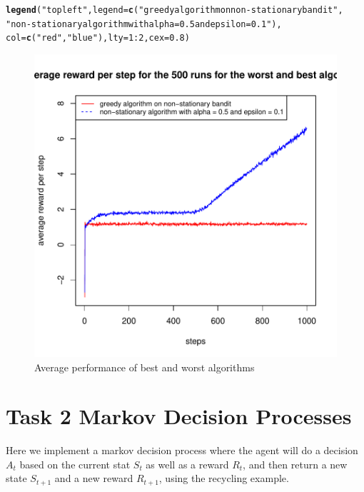 \documentclass[10pt, a4paper, english]{article}\usepackage[]{graphicx}\usepackage[dvipsnames]{xcolor}
\makeatletter
\def\maxwidth{ %
  \ifdim\Gin@nat@width>\linewidth
    \linewidth
  \else
    \Gin@nat@width
  \fi
}
\newcommand{\hlnum}[1]{\textcolor[rgb]{0.686,0.059,0.569}{#1}}%
\newcommand{\hlstr}[1]{\textcolor[rgb]{0.192,0.494,0.8}{#1}}%
\newcommand{\hlopt}[1]{\textcolor[rgb]{0,0,0}{#1}}%
\newcommand{\hlstd}[1]{\textcolor[rgb]{0.345,0.345,0.345}{#1}}%
\newcommand{\hlkwc}[1]{\textcolor[rgb]{0.333,0.667,0.333}{#1}}%
\newcommand{\hlkwd}[1]{\textcolor[rgb]{0.737,0.353,0.396}{\textbf{#1}}}%
\newenvironment{kframe}{%
 \def\at@end@of@kframe{}%
 \ifinner\ifhmode%
  \def\at@end@of@kframe{\end{minipage}}%
  \begin{minipage}{\columnwidth}%
 \fi\fi%
 \def\FrameCommand##1{\hskip\@totalleftmargin \hskip-\fboxsep
 \colorbox{shadecolor}{##1}\hskip-\fboxsep
     \hskip-\linewidth \hskip-\@totalleftmargin \hskip\columnwidth}%
 \MakeFramed {\advance\hsize-\width
   \@totalleftmargin\z@ \linewidth\hsize
   \@setminipage}}%
 {\par\unskip\endMakeFramed%
 \at@end@of@kframe}
\newenvironment{knitrout}{}{} %
\makeatother
\begin{document}
\begin{knitrout}
\begin{kframe}
\begin{alltt}
\hlkwd{legend}\hlstd{(}\hlstr{"topleft"}\hlstd{,} \hlkwc{legend} \hlstd{=} \hlkwd{c}\hlstd{(}\hlstr{"greedy algorithm on non-stationary bandit"}\hlstd{,}
                 \hlstr{"non-stationary algorithm with alpha = 0.5 and epsilon = 0.1"}\hlstd{),}
       \hlkwc{col} \hlstd{=} \hlkwd{c}\hlstd{(}\hlstr{"red"}\hlstd{,} \hlstr{"blue"}\hlstd{),} \hlkwc{lty} \hlstd{=} \hlnum{1}\hlopt{:}\hlnum{2}\hlstd{,} \hlkwc{cex} \hlstd{=} \hlnum{0.8}\hlstd{)}
\end{alltt}
\end{kframe}\begin{figure}
\includegraphics[width=\maxwidth]{figure/unnamed-chunk-12-1} \caption[Average performance of best and worst algorithms]{Average performance of best and worst algorithms}\label{fig:unnamed-chunk-12}
\end{figure}

\end{knitrout}
 



\section{Task 2 Markov Decision Processes}
Here we implement a markov decision process where the agent will do a decision $A_t$ based on the current stat $S_t$ as well as a reward $R_t$, and then return a new state $S_{t+1}$ and a new reward $R_{t+1}$, using the recycling example.
\end{document}

